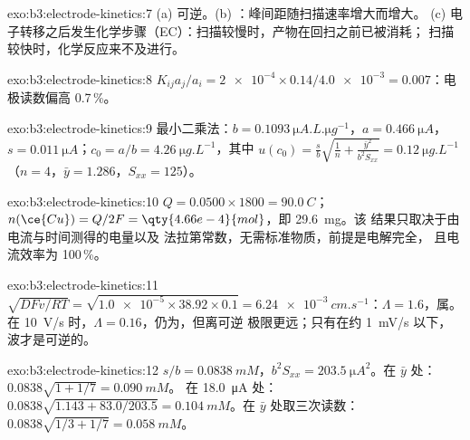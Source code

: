 \begin{solution}{exo:b3:electrode-kinetics:7}
(a) 可逆。(b) ：峰间距随扫描速率增大而增大。
(c) 电子转移之后发生化学步骤（EC）：扫描较慢时，产物在回扫之前已被消耗；
扫描较快时，化学反应来不及进行。
\end{solution}

\begin{solution}{exo:b3:electrode-kinetics:8}
$K_{ij}a_j/a_i = \num{2e-4} \times 0.14/\num{4.0e-3} = 0.007$：电极读数偏高 0.7\,\%。
\end{solution}

\begin{solution}{exo:b3:electrode-kinetics:9}
最小二乘法：$b = \qty{0.1093}{\micro A.L.\micro g^{-1}}$，$a = \qty{0.466}{\micro A}$，$s = \qty{0.011}{\micro A}$；$c_0 = a/b =
\qty{4.26}{\micro g.L^{-1}}$，其中 $u(c_0) = \frac sb\sqrt{\frac1n + \frac{\bar y^2}{b^2S_{xx}}} = \qty{0.12}{\micro g.L^{-1}}$
（$n = 4$，$\bar y = 1.286$，$S_{xx} = 125$）。
\end{solution}

\begin{solution}{exo:b3:electrode-kinetics:10}
$Q = 0.0500 \times 1800 = \qty{90.0}{C}$；$n(\ce{Cu}) = Q/2F = \qty{4.66e-4}{mol}$，即 \qty{29.6}{mg}。该
结果只取决于由电流与时间测得的电量以及
法拉第常数，无需标准物质，前提是电解完全，
且电流效率为 100\,\%。
\end{solution}

\begin{solution}{exo:b3:electrode-kinetics:11}
$\sqrt{DFv/RT} = \sqrt{\num{1.0e-5} \times 38.92 \times 0.1} = \qty{6.24e-3}{cm.s^{-1}}$：$\Lambda = 1.6$，属。
在 \qty{10}{V/s} 时，$\Lambda = 0.16$，仍为，但离可逆
极限更远；只有在约 \qty{1}{mV/s} 以下，波才是可逆的。
\end{solution}

\begin{solution}{exo:b3:electrode-kinetics:12}
$s/b = \qty{0.0838}{mM}$，$b^2S_{xx} = \qty{203.5}{\micro A^2}$。在 $\bar y$ 处：$0.0838\sqrt{1 + 1/7} = \qty{0.090}{mM}$。
在 \qty{18.0}{\micro A} 处：$0.0838\sqrt{1.143 + 83.0/203.5} = \qty{0.104}{mM}$。在 $\bar y$ 处取三次读数：
$0.0838\sqrt{1/3 + 1/7} = \qty{0.058}{mM}$。
\end{solution}


